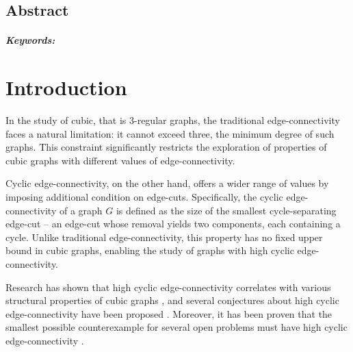 \documentclass[12pt, twoside]{book}
\begin{document}
\newpage

\begin{otherlanguage}{USenglish}
    \section*{Abstract}

    \thesisabstracten{}

    \paragraph*{Keywords:} \thesiskeywordsen{}
\end{otherlanguage}

\newpage
\tableofcontents

\newpage
\listoffigures

\mainmatter{}

\chapter*{Introduction}

In the study of cubic, that is 3-regular graphs, the traditional edge-connectivity faces a natural limitation: it cannot exceed three, the minimum degree of such graphs. This constraint significantly restricts the exploration of properties of cubic graphs with different values of edge-connectivity.

Cyclic edge-connectivity, on the other hand, offers a wider range of values by imposing additional condition on edge-cuts. Specifically, the cyclic edge-connectivity of a graph $G$ is defined as the size of the smallest cycle-separating edge-cut -- an edge-cut whose removal yields two components, each containing a cycle. Unlike traditional edge-connectivity, this property has no fixed upper bound in cubic graphs, enabling the study of graphs with high cyclic edge-connectivity.

Research has shown that high cyclic \mbox{edge-connectivity} correlates with various structural properties of cubic graphs \cite{Andersen1988, Doslic2003, McCuaig1992, Thomassen1983}, and several conjectures about high cyclic edge-connectivity have been proposed \cite{Fleischner1988, Thomassen1986}. Moreover, it has been proven that the smallest possible counterexample for several open problems must have high cyclic edge-connectivity \cite{Kochol2004, Macajova2020}.
\end{document}
